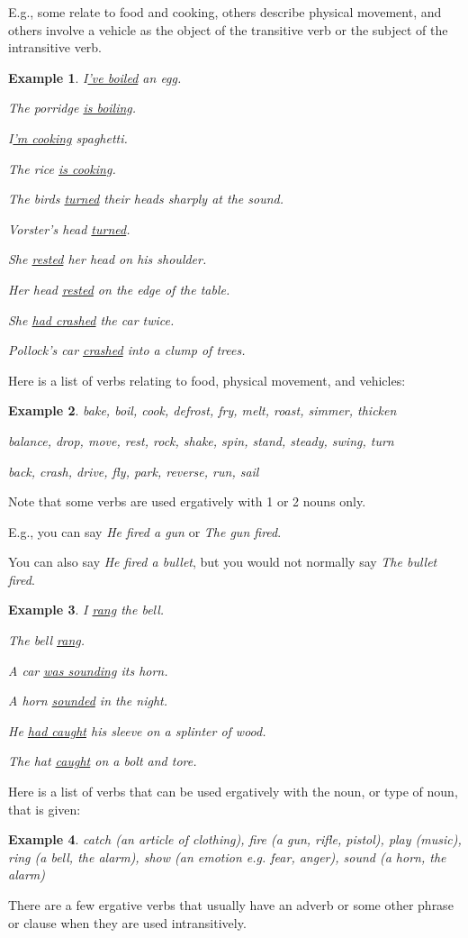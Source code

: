 \documentclass[oneside]{book}
\numberwithin{equation}{section}
\newtheorem{example}{Example}[section]
\begin{document}
E.g., some relate to food and cooking, others describe physical movement, and others involve a vehicle as the object of the transitive verb or the subject of the intransitive verb.
\begin{example}
    I\underline{'ve boiled} an egg.
    
    The porridge \underline{is boiling}.
    
    I\underline{'m cooking} spaghetti.
    
    The rice \underline{is cooking}.
    
    The birds \underline{turned} their heads sharply at the sound.
    
    Vorster's head \underline{turned}.
    
    She \underline{rested} her head on his shoulder.
    
    Her head \underline{rested} on the edge of the table.
    
    She \underline{had crashed} the car twice.
    
    Pollock's car \underline{crashed} into a clump of trees.
\end{example}
%
\noindent{} Here is a list of verbs relating to food, physical movement, and vehicles:
\begin{example}
    bake, boil, cook, defrost, fry, melt, roast, simmer, thicken
    
    balance, drop, move, rest, rock, shake, spin, stand, steady, swing, turn
    
    back, crash, drive, fly, park, reverse, run, sail
\end{example}
%
\noindent{} Note that some verbs are used ergatively with 1 or 2 nouns only.

E.g., you can say \textit{He fired a gun} or \textit{The gun fired}.

You can also say \textit{He fired a bullet}, but you would not normally say \textit{The bullet fired}.
\begin{example}
    I \underline{rang} the bell.
    
    The bell \underline{rang}.
    
    A car \underline{was sounding} its horn.
    
    A horn \underline{sounded} in the night.
    
    He \underline{had caught} his sleeve on a splinter of wood.
    
    The hat \underline{caught} on a bolt and tore.
\end{example}
%
\noindent{} Here is a list of verbs that can be used ergatively with the noun, or type of noun, that is given:
\begin{example}
    catch (an article of clothing), fire (a gun, rifle, pistol), play (music), ring (a bell, the alarm), show (an emotion e.g. fear, anger), sound (a horn, the alarm)
\end{example}
%
\noindent{} There are a few ergative verbs that usually have an adverb or some other phrase or clause when they are used intransitively.
\end{document}
